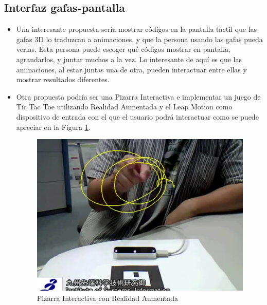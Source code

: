 \documentclass[11pt]{article} %
\begin{document}
\subsection {Interfaz gafas-pantalla}
\begin{itemize}
 \item Una interesante propuesta sería mostrar códigos en la pantalla táctil que las gafas 3D lo traduzcan a animaciones, y que la persona usando las gafas 
  pueda verlas. Esta persona puede escoger qué códigos mostrar en pantalla, agrandarlos, y juntar muchos a la vez. Lo interesante de aquí es que las animaciones, 
  al estar juntas una de otra, pueden interactuar entre ellas y mostrar resultados diferentes.
  \item Otra propuesta podría ser una Pizarra Interactiva e implementar un juego de Tic Tac Toe utilizando Realidad Aumentada y el Leap Motion como dispositivo 
  de entrada con el que el usuario podrá interactuar como se puede apreciar en la Figura \ref{imgLeap}.
  
  \begin{figure}
   \centerline{\includegraphics[scale=0.50]{./img/leapAugmented.png}}
   \caption{Pizarra Interactiva con Realidad Aumentada}
   \label{imgLeap}
  \end{figure}
  

\end{itemize}
\end{document}
